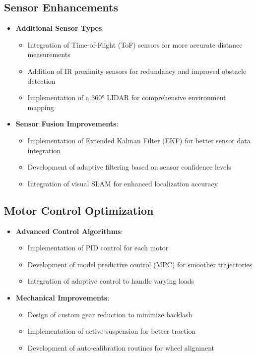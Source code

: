 \documentclass{article}
\begin{document}
\subsection{Sensor Enhancements}
\begin{itemize}
    \item \textbf{Additional Sensor Types}:
        \begin{itemize}
            \item Integration of Time-of-Flight (ToF) sensors for more accurate distance measurements
            \item Addition of IR proximity sensors for redundancy and improved obstacle detection
            \item Implementation of a 360° LIDAR for comprehensive environment mapping
        \end{itemize}
    
    \item \textbf{Sensor Fusion Improvements}:
        \begin{itemize}
            \item Implementation of Extended Kalman Filter (EKF) for better sensor data integration
            \item Development of adaptive filtering based on sensor confidence levels
            \item Integration of visual SLAM for enhanced localization accuracy
        \end{itemize}
\end{itemize}

\subsection{Motor Control Optimization}
\begin{itemize}
    \item \textbf{Advanced Control Algorithms}:
        \begin{itemize}
            \item Implementation of PID control for each motor
            \item Development of model predictive control (MPC) for smoother trajectories
            \item Integration of adaptive control to handle varying loads
        \end{itemize}
    
    \item \textbf{Mechanical Improvements}:
        \begin{itemize}
            \item Design of custom gear reduction to minimize backlash
            \item Implementation of active suspension for better traction
            \item Development of auto-calibration routines for wheel alignment
        \end{itemize}
\end{itemize}
\end{document}
